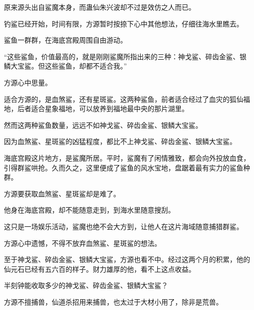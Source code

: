 \begin{this_body}
原来源头出自鲨魔本身，而蛊仙朱兴波却不过是效仿之人而已。

钓鲨已经开始，时间有限，方源暂时按捺下心中其他想法，仔细往海水里瞧去。

鲨鱼一群群，在海底宫殿周围自由游动。

“这些鲨鱼，价值最高的，就是刚刚鲨魔所指出来的三种：神戈鲨、碎齿金鲨、银鳞大宝鲨。但这些鲨鱼，却都不适合我。”

方源心中思量。

适合方源的，是血煞鲨，还有星斑鲨。这两种鲨鱼，前者适合经过了血灾的狐仙福地，后者适合星象福地，可以放养到福地最中央的那片湖里。

然而这两种鲨鱼数量，远远不如神戈鲨、碎齿金鲨、银鳞大宝鲨。

因为血煞鲨、星斑鲨的凶猛程度，都比不上神戈鲨、碎齿金鲨、银鳞大宝鲨。

海底宫殿这片地方，是鲨魔所居。平时，鲨魔有了闲情雅致，都会向外投放血食，引得群鲨哄抢。久而久之，这里便成了鲨鱼的风水宝地，盘踞着最有实力的鲨鱼种群。

方源要获取血煞鲨、星斑鲨却是难了。

他身在海底宫殿，却不能随意走到，到海水里随意搜刮。

这只是一场娱乐活动，鲨魔也绝不会大方到，让他人在这片海域随意捕猎群鲨。

方源心中遗憾，不得不放弃血煞鲨、星斑鲨的想法。

至于神戈鲨、碎齿金鲨、银鳞大宝鲨，方源也看不中。经过这两个月的积累，他的仙元石已经有五六百的样子。财力雄厚的他，看不上这点收益。

半刻钟能收取多少的神戈鲨、碎齿金鲨、银鳞大宝鲨？

方源不擅捕兽，仙道杀招用来捕兽，也太过于大材小用了，除非是荒兽。

\end{this_body}

